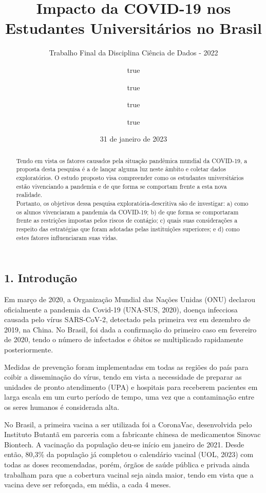 \documentclass[
]{article}
\title{Impacto da COVID-19 nos Estudantes Universitários no Brasil}
\subtitle{Trabalho Final da Disciplina Ciência de Dados - 2022}
\author{true \and true \and true \and true}
\date{31 de janeiro de 2023}
\begin{document}
\maketitle
\begin{abstract}
Tendo em vista os fatores causados pela situação pandêmica mundial da
COVID-19, a proposta desta pesquisa é a de lançar alguma luz neste
âmbito e coletar dados exploratórios. O estudo proposto visa compreender
como os estudantes universitários estão vivenciando a pandemia e de que
forma se comportam frente a esta nova realidade.\\
Portanto, os objetivos dessa pesquisa exploratória-descritiva são de
investigar: a) como os alunos vivenciaram a pandemia da COVID-19; b) de
que forma se comportaram frente as restrições impostas pelos riscos de
contágio; c) quais suas considerações a respeito das estratégias que
foram adotadas pelas instituições superiores; e d) como estes fatores
influenciaram suas vidas.
\end{abstract}

\hypertarget{introduuxe7uxe3o}{%
\subsection{1. Introdução}\label{introduuxe7uxe3o}}

Em março de 2020, a Organização Mundial das Nações Unidas (ONU) declarou
oficialmente a pandemia da Covid-19 (UNA-SUS, 2020), doença infecciosa
causada pelo vírus SARS-CoV-2, detectado pela primeira vez em dezembro
de 2019, na China. No Brasil, foi dada a confirmação do primeiro caso em
fevereiro de 2020, tendo o número de infectados e óbitos se multiplicado
rapidamente posteriormente.

Medidas de prevenção foram implementadas em todas as regiões do país
para coibir a disseminação do vírus, tendo em vista a necessidade de
preparar as unidades de pronto atendimento (UPA) e hospitais para
receberem pacientes em larga escala em um curto período de tempo, uma
vez que a contaminação entre os seres humanos é considerada alta.

No Brasil, a primeira vacina a ser utilizada foi a CoronaVac,
desenvolvida pelo Instituto Butantã em parceria com a fabricante chinesa
de medicamentos Sinovac Biontech. A vacinação da população deu-se início
em janeiro de 2021. Desde então, 80,3\% da população já completou o
calendário vacinal (UOL, 2023) com todas as doses recomendadas, porém,
órgãos de saúde pública e privada ainda trabalham para que a cobertura
vacinal seja ainda maior, tendo em vista que a vacina deve ser
reforçada, em média, a cada 4 meses.
\end{document}
